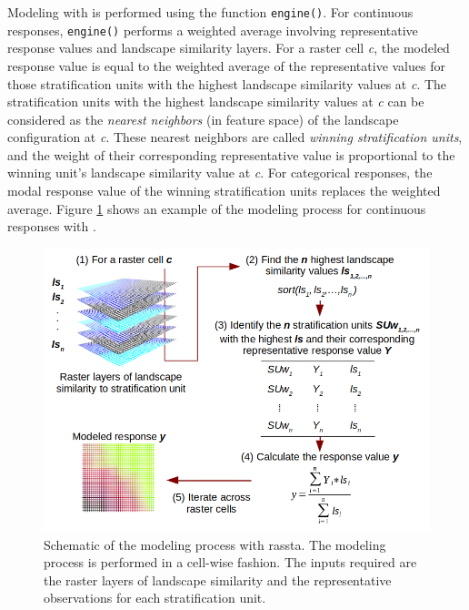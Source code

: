 Modeling with  is performed using the function \texttt{engine()}. For
continuous responses, \texttt{engine()} performs a weighted average involving
representative response values and landscape similarity layers. For a raster
cell \emph{c}, the modeled response value is equal to the weighted average of the
representative values for those stratification units with the highest landscape
similarity values at \emph{c}. The stratification units with the highest landscape
similarity values at \emph{c} can be considered as the \emph{nearest neighbors} (in
feature space) of the landscape configuration at \emph{c}. These nearest neighbors
are called \emph{winning stratification units}, and the weight of their corresponding
representative value is proportional to the winning unit's landscape similarity
value at \emph{c}. For categorical responses, the modal response value of the winning
stratification units replaces the weighted average. Figure \ref{fig:f16} shows
an example of the modeling process for continuous responses with .

\begin{figure}[H]

{\centering \includegraphics[width=0.75\linewidth]{figures/figure_15} 

}

\caption{Schematic of the modeling process with rassta. The modeling process is performed in a cell-wise fashion. The inputs required are the raster layers of landscape similarity and the representative observations for each stratification unit.}\label{fig:f16}
\end{figure}

